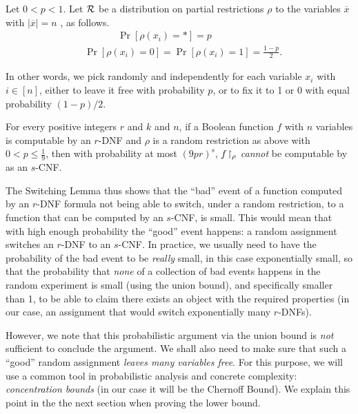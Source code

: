 \begin{tcolorbox}[colframe=white, colback=green!6, boxrule=0mm, sharp corners]
\begin{definition}\label{def:random-rest}
 Let $0< p<1$.
Let $\mathcal{R}$ be a distribution on partial restrictions $\rho$ to the variables $\overline{x}$ with $|\overline{x}|=n$ , as follows.
$$
\begin{aligned}
& ~~~~~~~~~~~ \quad \operatorname{Pr}\left[\rho\left(x_i\right)=*\right]=p \\
& \operatorname{Pr}\left[\rho\left(x_i\right)=0\right]=\operatorname{Pr}\left[\rho\left(x_i\right)=1\right]=\frac{1-p}{2}.
\end{aligned}
$$
\end{definition}
\end{tcolorbox}
In other words, we pick randomly and independently for each variable $x_i$ with $i\in[n]$, either to leave it free with probability $p$, or to fix it to 1 or 0 with equal probability $(1-p)/2$.


\begin{tcolorbox}[colframe=white, colback=blue!5, boxrule=0mm, sharp corners]
\begin{theorem}\label{thm:Switching-Lemma}
For every positive integers $r$ and $k$ and $n$, if a Boolean function $f$ with $n$ variables is computable by an $r$-DNF and $\rho$ is a random restriction as above with $0<p \leq \frac{1}{9}$, then with probability at most $(9pr)^s$, $f\!\upharpoonright_\rho$ \emph{cannot} be computable by as an $s$-CNF.
\end{theorem}
\end{tcolorbox}

The Switching Lemma thus shows that the ``bad'' event of a function computed by an $r$-DNF formula not being able to switch, under  a random restriction,  to a function that can be computed by an $s$-CNF, is small. This would mean that with high enough probability the ``good'' event happens: a random assignment switches an $r$-DNF to an $s$-CNF.
In practice, we usually need to have the probability of the bad event to be \emph{really} small, in this case  exponentially small, so that the probability that \emph{none} of a collection of bad events happens in the random experiment is small (using the union bound), and specifically smaller than 1, to be able to claim there exists an object with the required properties (in our case, an assignment that would switch exponentially many $r$-DNFs).  

However, we note that this probabilistic argument via the union bound  is  \emph{not} sufficient to conclude the argument. We shall also need to make sure that such a ``good'' random assignment  \emph{leaves many variables free}. For this purpose, we will use a common tool in probabilistic analysis and concrete complexity: \emph{concentration bounds} (in our case it will be the Chernoff Bound). We  explain this point in the the next section when proving the lower bound.


